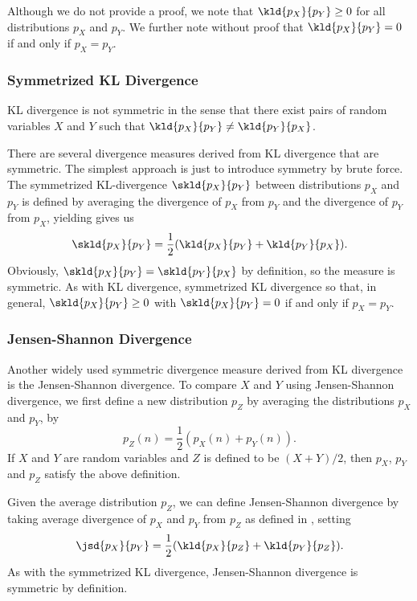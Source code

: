 Although we do not provide a proof, we note that $\kld{p_X}{p_Y} \geq 0$
for all distributions $p_X$ and $p_Y$.  We further note without proof
that $\kld{p_X}{p_Y} = 0$ if and only if $p_X = p_Y$.


\subsubsection{Symmetrized KL Divergence}\label{section:stats-symmetrized-kl-divergence}

KL divergence is not symmetric in the sense that there exist pairs of
random variables $X$ and $Y$ such that $\kld{p_X}{p_Y} \neq \kld{p_Y}{p_X}$.

There are several divergence measures derived from KL divergence that
are symmetric.  The simplest approach is just to introduce symmetry by
brute force.  The symmetrized KL-divergence $\skld{p_X}{p_Y}$ between
distributions $p_X$ and $p_Y$ is defined by averaging the divergence
of $p_X$ from $p_Y$ and the divergence of $p_Y$ from $p_X$, yielding
gives us
%
\begin{equation}
\skld{p_X}{p_Y} = \frac{1}{2}(\kld{p_X}{p_Y} + \kld{p_Y}{p_X}).
\end{equation}
%
Obviously, $\skld{p_X}{p_Y} = \skld{p_Y}{p_X}$ by definition, so the
measure is symmetric.  As with KL divergence, symmetrized KL
divergence so that, in general, $\skld{p_X}{p_Y} \geq 0$ with
$\skld{p_X}{p_Y} = 0$ if and only if $p_X = p_Y$.

\subsubsection{Jensen-Shannon Divergence}

Another widely used symmetric divergence measure derived from KL divergence
is the Jensen-Shannon divergence.  To compare $X$ and $Y$ using Jensen-Shannon
divergence, we first define a new distribution $p_{Z}$ by averaging
the distributions $p_X$ and $p_Y$, by
%
\begin{equation}\label{eq:jensen-shannon-averge-distro}
p_Z(n) = \frac{1}{2}(p_X(n) + p_Y(n)).
\end{equation}
%
If $X$ and $Y$ are random variables and $Z$ is defined to be
$(X+Y)/2$, then $p_X$, $p_Y$ and $p_Z$ satisfy the above definition.

Given the average distribution $p_Z$, we can define Jensen-Shannon
divergence by taking average divergence of $p_X$ and $p_Y$ from $p_Z$
as defined in , setting
%
\begin{equation}
\jsd{p_X}{p_Y} = \frac{1}{2}(\kld{p_X}{p_Z} + \kld{p_Y}{p_Z}).
\end{equation}
%
As with the symmetrized KL divergence, Jensen-Shannon divergence is
symmetric by definition.


